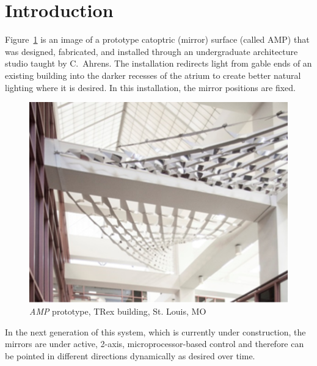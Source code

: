 \section{Introduction}
\label{sec:intro}


Figure~\ref{fig:amp} is an image of a prototype catoptric (mirror) surface
(called AMP) that was designed, fabricated, and installed through an
undergraduate architecture studio taught by C.~Ahrens. The installation
redirects light from gable ends of an existing building into the darker
recesses of the atrium to create better natural lighting where it is desired.
In this installation, the mirror positions are fixed.

\begin{figure}[ht]
\centering
\includegraphics[width=0.45\linewidth]{figures/amp}
\caption{\emph{AMP} prototype, TRex building, St. Louis, MO}
\label{fig:amp}
\end{figure}

In the next generation of this system, which is currently under construction,
the mirrors are under active, 2-axis, microprocessor-based control and
therefore can be pointed in different directions dynamically as desired
over time.





